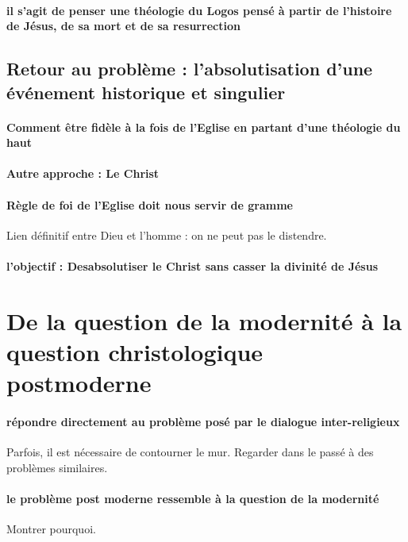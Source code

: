 \paragraph{il s'agit de penser une théologie du Logos pensé à partir de l'histoire de Jésus, de sa mort et de sa resurrection}



\subsection{Retour au problème : l’absolutisation d’une événement historique et singulier} 

\paragraph{Comment être fidèle à la fois de l'Eglise en partant d'une théologie du haut} 

\paragraph{Autre approche : Le Christ}

\paragraph{Règle de foi de l'Eglise doit nous servir de gramme} Lien définitif entre Dieu et l'homme : on ne peut pas le distendre. 

\paragraph{l'objectif : Desabsolutiser le Christ sans casser la divinité de Jésus
} 

\section{De la question de la modernité à la question christologique postmoderne}

\paragraph{répondre directement au problème posé par le dialogue inter-religieux} Parfois, il est nécessaire de contourner le mur. Regarder dans le passé à des problèmes similaires. 

\paragraph{le problème post moderne ressemble à la question de la modernité} Montrer pourquoi.


